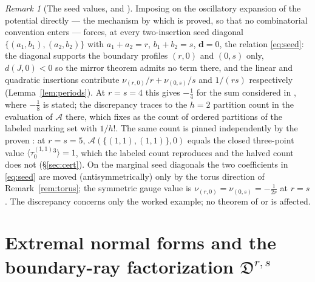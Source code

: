 \documentclass[11pt]{amsart}
\theoremstyle{definition}
\theoremstyle{remark}
\newtheorem{remark}[theorem]{Remark}
\newcommand{\Dscr}{\mathfrak{D}}
\newcommand{\Ascr}{\mathcal{A}}
\begin{document}
\begin{remark}[The seed values, and {\cite[Ex.~5.5]{GKTsurvey}}]
\label{rem:ex55}
Imposing \cite[Thm.~0.3]{GKT} on the oscillatory expansion of the potential
directly --- the mechanism by which \cite[Thm.~0.2]{GKT} is proved, so that no
combinatorial convention enters --- forces, at every two-insertion seed diagonal
$\{(a_{1},b_{1}),(a_{2},b_{2})\}$ with $a_{1}{+}a_{2}=r$, $b_{1}{+}b_{2}=s$,
$\mathbf d=0$, the relation \eqref{eq:seed}: the diagonal supports the boundary
profiles $(r,0)$ and $(0,s)$ only, $d(J,0)<0$ so the mirror theorem admits no term
there, and the linear and quadratic insertions contribute
$\nu_{(r,0)}/r+\nu_{(0,s)}/s$ and $1/(rs)$ respectively
(Lemma~\ref{lem:periods}).
At $r=s=4$ this gives $-\tfrac14$ for the sum considered in
\cite[Ex.~5.5]{GKTsurvey}, where $-\tfrac18$ is stated; the discrepancy traces to
the $h=2$ partition count in the evaluation of $\Ascr$ there, which
\cite[Notation~3.42 and Thm.~4.9]{GKT} fixes as the count of ordered partitions of the labeled
marking set with $1/h!$. The same count is pinned independently by the proven
\cite[Thm.~5.4]{GKT}: at $r=s=5$, $\Ascr(\{(1,1),(1,1)\},0)$ equals the closed
three-point value $\langle\tau_{0}^{(1,1)}{}^{3}\rangle=1$, which the labeled
count reproduces and the halved count does not (\S\ref{sec:cert}). On the marginal seed diagonals the two
coefficients in \eqref{eq:seed} are moved (antisymmetrically) only by the torus
direction of Remark~\ref{rem:torus}; the symmetric gauge value is
$\nu_{(r,0)}=\nu_{(0,s)}=-\tfrac1{2r}$ at $r=s$. The discrepancy concerns
only the worked example; no theorem of \cite{GKT} or \cite{GKTsurvey} is
affected.
\end{remark}

\section{Extremal normal forms and the boundary-ray factorization
\texorpdfstring{$\Dscr^{r,s}$}{D(r,s)}}
\label{sec:canonical}
\end{document}
